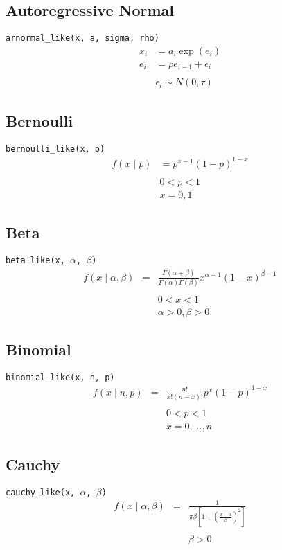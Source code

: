 \subsection*{Autoregressive Normal} 
\verb=arnormal_like(x, a, sigma, rho)=
\begin{eqnarray*}
	x_i & = a_i \exp(e_i) \\
   e_i & = \rho e_{i-1} + \epsilon_i \\
 \\
 & \epsilon_i \sim N(0,\tau)	
\end{eqnarray*}

\subsection*{Bernoulli}
\verb=bernoulli_like(x, p)=
\begin{eqnarray*}
f(x \mid p) &= p^{x- 1} (1-p)^{1-x} \\
\\
&0 < p < 1 \\
&x=0,1
\end{eqnarray*}

\subsection*{Beta}
\verb=beta_like(x, =$\alpha$\verb=, =$\beta$\verb=)=
\begin{eqnarray*}
f(x \mid \alpha, \beta) &=& \frac{\Gamma(\alpha + \beta)}{\Gamma(\alpha) \Gamma(\beta)} x^{\alpha - 1} (1 - x)^{\beta - 1} \\
\\
&&0 < x < 1 \\
&&\alpha > 0, \beta > 0
\end{eqnarray*}

\subsection*{Binomial}
\verb=binomial_like(x, n, p)=
\begin{eqnarray*}
f(x \mid n, p) &=& \frac{n!}{x!(n-x)!}p^x (1-p)^{1-x} \\
\\
&&0 < p < 1 \\
&&x = 0,\ldots,n
\end{eqnarray*}

\subsection*{Cauchy}
\verb=cauchy_like(x, =$\alpha$\verb=, =$\beta$\verb=)=
\begin{eqnarray*}
f(x \mid \alpha, \beta) &=& \frac{1}{\pi \beta [1 + (\frac{x-\alpha}{\beta})^2]} \\
\\
&& \beta > 0
\end{eqnarray*}

